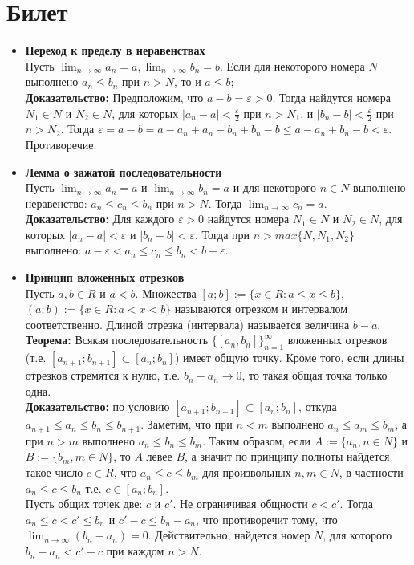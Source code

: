 \documentclass[12pt,a4paper]{article}
\begin{document}
\section{Билет}
\begin{itemize}
\item \textbf{Переход к пределу в неравенствах} \\
Пусть $\lim_{n \to \infty}{a_n = a}, \lim_{n \to \infty}{b_n = b}$. Если для некоторого номера $N$ выполнено $a_n \leq b_n$ при $n > N$, то и $a \leq b$; \\
\textbf{Доказательство:} Предположим, что $a-b = \varepsilon > 0$. Тогда найдутся номера $N_1 \in N$ и $N_2 \in N$, для которых $|a_n - a| < \frac{\varepsilon}{2}$ при $n > N_1$, и $|b_n-b| < \frac{\varepsilon}{2}$ при $n > N_2$. Тогда $\varepsilon = a - b = a - a_n + a_n - b_n + b_n - b \leq a - a_n + b_n - b < \varepsilon$. Противоречие. 

\item \textbf{ Лемма о зажатой последовательности} \\
Пусть $\lim_{n \to \infty}{a_n = a}$ и $\lim_{n \to \infty}{b_n = a}$ и для некоторого $n \in N$ выполнено неравенство: $a_n \leq c_n \leq b_n$ при $n > N$. Тогда $\lim_{n \to \infty}{c_n = a}$. \\
\textbf{Доказательство:} Для каждого $\varepsilon > 0$ найдутся номера $N_1 \in N$ и $N_2 \in N$, для которых $|a_n - a| < \varepsilon$ и $|b_n - b| < \varepsilon$. Тогда при $n > max\{N, N_1, N_2\}$ выполнено: $a - \varepsilon < a_n \leq c_n \leq b_n < b + \varepsilon$.

\item \textbf{Принцип вложенных отрезков} \\
Пусть $a, b \in R$ и $a < b$. Множества $[a; b] := \{x \in R: a \leq x \leq b\}$, $(a;b) := \{ x \in R: a < x < b \}$ называются отрезком и интервалом соответственно. Длиной отрезка (интервала) называется величина $b - a$. \\
\textbf{Теорема:} Всякая последовательность $\{[a_n, b_n]\}_{n=1}^{\infty}$ вложенных отрезков (т.е. $[a_{n+1};b_{n+1}] \subset [a_{n};b_{n}]$) имеет общую точку. Кроме того, если длины отрезков стремятся к нулю, т.е. $b_n - a_n \longrightarrow 0$, то такая общая точка только одна. \\
\textbf{Доказательство:} по условию $[a_{n+1}; b_{n+1}] \subset [a_{n}; b_{n}]$, откуда $a_{n+1} \leq a_n \leq b_n \leq b_{n+1}$. Заметим, что при $n < m$ выполнено $a_n \leq a_m \leq b_m$, а при $n > m$ выполнено $a_n \leq b_n \leq b_m$. Таким образом, если $A :=\{a_n, n \in N\}$ и $B := \{b_m, m \in N\}$, то $A$ левее $B$, а значит по принципу полноты найдется такое число $c \in R$, что $a_n \leq c \leq b_m$ для произвольных $n, m \in N$, в частности $a_n \leq c \leq b_n$ т.е. $c \in [a_n; b_n]$. \\
Пусть общих точек две: $c$ и $c'$. Не ограничивая общности $c < c'$. Тогда $a_n \leq c < c' \leq b_n$ и $c' - c \leq b_n - a_n$, что противоречит тому, что $\lim_{n \to \infty}{(b_n - a_n)} = 0$. Действительно, найдется номер $N$, для которого $b_n - a_n < c' - c$ при каждом $n > N$.


\end{itemize}
\end{document}
